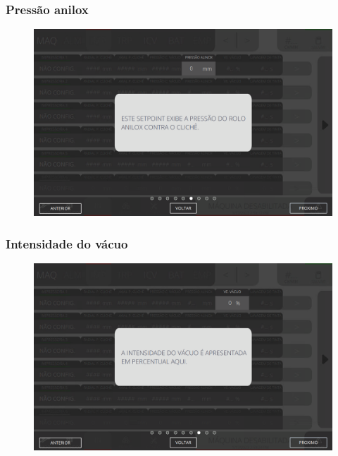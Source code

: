\newpage
\thispagestyle{fancy}
\vspace*{40 pt}
\subsubsection{\small{Pressão anilox}} \label{sec:telaAjustesImpressorasPressaoAnilox}
\vspace*{\fill}
\begin{figure}[h]
    \centering
    \includegraphics[width=576 px,height=360 px]{src/imagesICV/04-printters/01-printters/settings/6.png}
\end{figure}
\vspace*{\fill}

\newpage
\thispagestyle{fancy}
\vspace*{40 pt}
\subsubsection{\small{Intensidade do vácuo}} \label{sec:telaAjustesImpressorasIntensidadeVaco}
\vspace*{\fill}
\begin{figure}[h]
    \centering
    \includegraphics[width=576 px,height=360 px]{src/imagesICV/04-printters/01-printters/settings/7.png}
\end{figure}
\vspace*{\fill}

